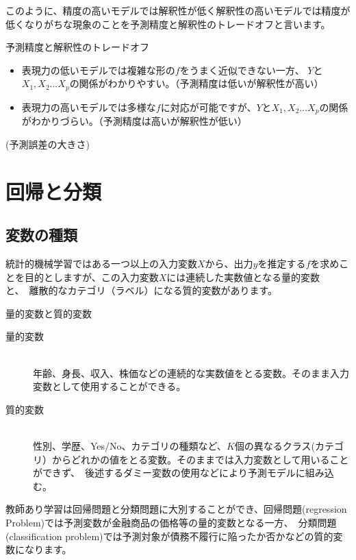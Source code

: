 \documentclass[uplatex]{jsarticle}
\begin{document}
このように、精度の高いモデルでは解釈性が低く解釈性の高いモデルでは精度が低くなりがちな現象のことを予測精度と解釈性のトレードオフと言います。
\begin{itembox}[l]{予測精度と解釈性のトレードオフ}
  \begin{itemize}
    \item 表現力の低いモデルでは複雑な形の$f$をうまく近似できない一方、 $Y$と$X_1, X_2 \dots X_p$の関係がわかりやすい。（予測精度は低いが解釈性が高い）
    \item 表現力の高いモデルでは多様な$f$に対応が可能ですが、$Y$と$X_1, X_2 \dots X_p$の関係がわかりづらい。（予測精度は高いが解釈性が低い）
  \end{itemize}
\end{itembox}
(予測誤差の大きさ)

\section{回帰と分類}
\subsection{変数の種類}
統計的機械学習ではある一つ以上の入力変数$X$から、出力$y$を推定する$f$を求めことを目的としますが、この入力変数$X$には連続した実数値となる量的変数と、\
離散的なカテゴリ（ラベル）になる質的変数があります。
\begin{itembox}[l]{量的変数と質的変数}
  \begin{description}
    \item [量的変数]\mbox{}\\
    年齢、身長、収入、株価などの連続的な実数値をとる変数。そのまま入力変数として使用することができる。
    \item [質的変数]\mbox{}\\
    性別、学歴、Yes/No、カテゴリの種類など、$K$個の異なるクラス(カテゴリ）からどれかの値をとる変数。そのままでは入力変数として用いることができず、\
    後述するダミー変数の使用などにより予測モデルに組み込む。
  \end{description}
\end{itembox}
教師あり学習は回帰問題と分類問題に大別することができ、回帰問題(regression Problem)では予測変数が金融商品の価格等の量的変数となる一方、\
分類問題(classification problem)では予測対象が債務不履行に陥ったか否かなどの質的変数になります。\\
\end{document}
